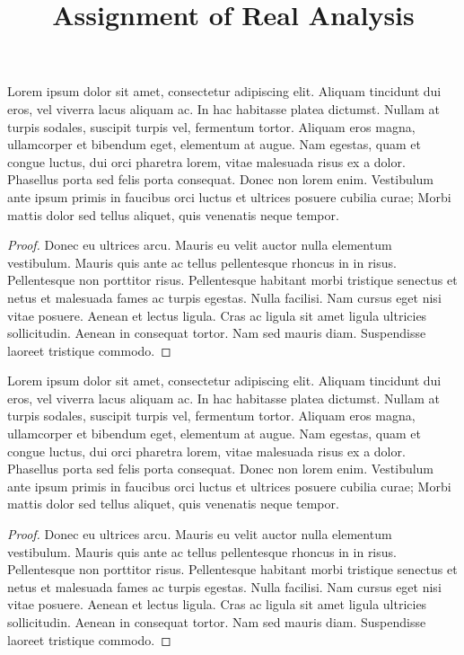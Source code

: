 \documentclass{article}
\title{Assignment of Real Analysis}
\theoremstyle{definition} \newtheorem{definition}{Definition}[section]
\theoremstyle{plain} \newtheorem{proposition}{Proposition}[section]
\theoremstyle{remark} \newtheorem{example}{Example}[section]
\theoremstyle{plain} \newtheorem{theorem}{Theorem}[section]
\newenvironment{tcbproblem}[1]{
    \begin{tcolorbox}[title = {Problem #1}]
    }{
    \end{tcolorbox}
}
\begin{document}
    \maketitle


    \begin{tcbproblem}{A1.1}
        Lorem ipsum dolor sit amet, consectetur adipiscing elit. Aliquam tincidunt dui eros, vel viverra lacus aliquam ac. In hac habitasse platea dictumst. Nullam at turpis sodales, suscipit turpis vel, fermentum tortor. Aliquam eros magna, ullamcorper et bibendum eget, elementum at augue. Nam egestas, quam et congue luctus, dui orci pharetra lorem, vitae malesuada risus ex a dolor. Phasellus porta sed felis porta consequat. Donec non lorem enim. Vestibulum ante ipsum primis in faucibus orci luctus et ultrices posuere cubilia curae; Morbi mattis dolor sed tellus aliquet, quis venenatis neque tempor.
    \end{tcbproblem}
    \begin{proof}[Proof]
        Donec eu ultrices arcu. Mauris eu velit auctor nulla elementum vestibulum. Mauris quis ante ac tellus pellentesque rhoncus in in risus. Pellentesque non porttitor risus. Pellentesque habitant morbi tristique senectus et netus et malesuada fames ac turpis egestas. Nulla facilisi. Nam cursus eget nisi vitae posuere. Aenean et lectus ligula. Cras ac ligula sit amet ligula ultricies sollicitudin. Aenean in consequat tortor. Nam sed mauris diam. Suspendisse laoreet tristique commodo.
    \end{proof}

    \begin{tcbproblem}{A1.2}
        Lorem ipsum dolor sit amet, consectetur adipiscing elit. Aliquam tincidunt dui eros, vel viverra lacus aliquam ac. In hac habitasse platea dictumst. Nullam at turpis sodales, suscipit turpis vel, fermentum tortor. Aliquam eros magna, ullamcorper et bibendum eget, elementum at augue. Nam egestas, quam et congue luctus, dui orci pharetra lorem, vitae malesuada risus ex a dolor. Phasellus porta sed felis porta consequat. Donec non lorem enim. Vestibulum ante ipsum primis in faucibus orci luctus et ultrices posuere cubilia curae; Morbi mattis dolor sed tellus aliquet, quis venenatis neque tempor.
    \end{tcbproblem}
    \begin{proof}[Proof]
        Donec eu ultrices arcu. Mauris eu velit auctor nulla elementum vestibulum. Mauris quis ante ac tellus pellentesque rhoncus in in risus. Pellentesque non porttitor risus. Pellentesque habitant morbi tristique senectus et netus et malesuada fames ac turpis egestas. Nulla facilisi. Nam cursus eget nisi vitae posuere. Aenean et lectus ligula. Cras ac ligula sit amet ligula ultricies sollicitudin. Aenean in consequat tortor. Nam sed mauris diam. Suspendisse laoreet tristique commodo.
    \end{proof}
\end{document}

